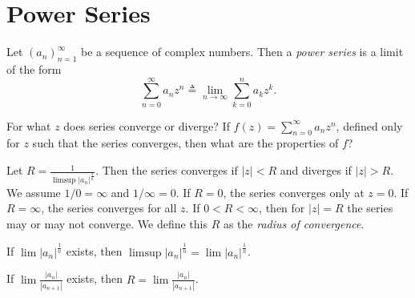 \section{Power Series}

\begin{defn}
Let $(a_n)_{n=1}^\infty$ be a sequence of complex numbers.
Then a \emph{power series} is a limit of the form
$$
           \sum_{n=0}^\infty a_n z^n
\triangleq \lim_{n \to \infty} \sum_{k=0}^n a_k z^k.
$$
\end{defn}

For what $z$ does series converge or diverge?
If $f(z) = \sum_{n=0}^\infty a_n z^n$, defined only
for $z$ such that the series converges, then what
are the properties of $f$?

\begin{theorem}
  Let $R = \frac{1}{\limsup |a_n|^{\frac{1}{n}}}$.
  Then the series converges if $|z| < R$ and diverges
  if $|z| > R$. We assume $1 / 0 = \infty$ and
  $1 / \infty = 0$. If $R = 0$, the series converges
  only at $z = 0$. If $R = \infty$, the series converges
  for all $z$. If $0 < R < \infty$, then for $|z| = R$
  the series may or may not converge. We define this
  $R$ as the \emph{radius of convergence}.
\end{theorem}

\begin{prop}
  If $\lim |a_n|^{\frac{1}{n}}$ exists, then
  $\limsup |a_n|^{\frac{1}{n}} = \lim |a_n|^{\frac{1}{n}}$.

  If $\lim \frac{|a_n|}{|a_{n+1}|}$ exists, then
  $R = \lim \frac{|a_n|}{|a_{n+1}|}$.
\end{prop}

